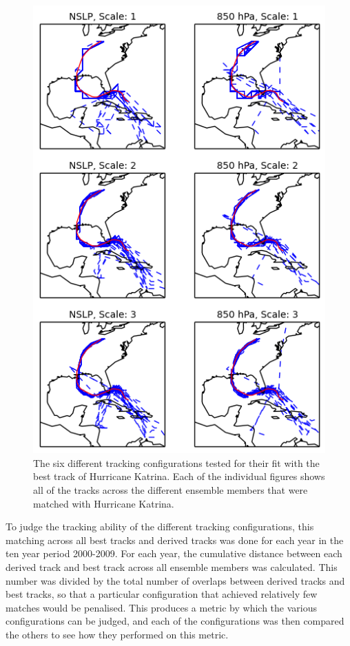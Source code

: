 \documentclass[pdftex,12pt,a4paper]{report}
\begin{document}
\begin{figure}[hbp]
    \centering
    \includegraphics[width=4.5in]{figures/katrina_six_tracking_configs}
    \caption{The six different tracking configurations tested for their fit with the best track of
        Hurricane Katrina. Each of the individual figures shows all of the tracks across the
        different ensemble members that were matched with Hurricane Katrina.}
    \label{fig:katrina_six_tracking_configs}
\end{figure}

To judge the tracking ability of the different tracking configurations, this matching across all
best tracks and derived tracks was done for each year in the ten year period 2000-2009. For each
year, the cumulative distance between each derived track and best track across all ensemble members
was calculated. This number was divided by the total number of overlaps between derived tracks and
best tracks, so that a particular configuration that achieved relatively few matches would be
penalised. This produces a metric by which the various configurations can be judged, and each of
the configurations was then compared the others to see how they performed on this metric. 
\end{document}

